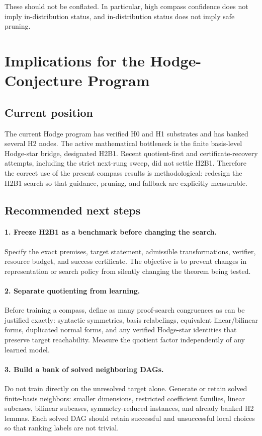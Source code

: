 \documentclass[11pt]{article}
\begin{document}
These should not be conflated. In particular, high compass confidence does not imply in-distribution status, and in-distribution status does not imply safe pruning.

\section{Implications for the Hodge-Conjecture Program}

\subsection{Current position}

The current Hodge program has verified H0 and H1 substrates and has banked several H2 nodes. The active mathematical bottleneck is the finite basis-level Hodge-star bridge, designated H2B1. Recent quotient-first and certificate-recovery attempts, including the strict next-rung sweep, did not settle H2B1. Therefore the correct use of the present compass results is methodological: redesign the H2B1 search so that guidance, pruning, and fallback are explicitly measurable.

\subsection{Recommended next steps}

\paragraph{1. Freeze H2B1 as a benchmark before changing the search.}
Specify the exact premises, target statement, admissible transformations, verifier, resource budget, and success certificate. The objective is to prevent changes in representation or search policy from silently changing the theorem being tested.

\paragraph{2. Separate quotienting from learning.}
Before training a compass, define as many proof-search congruences as can be justified exactly: syntactic symmetries, basis relabelings, equivalent linear/bilinear forms, duplicated normal forms, and any verified Hodge-star identities that preserve target reachability. Measure the quotient factor independently of any learned model.

\paragraph{3. Build a bank of solved neighboring DAGs.}
Do not train directly on the unresolved target alone. Generate or retain solved finite-basis neighbors: smaller dimensions, restricted coefficient families, linear subcases, bilinear subcases, symmetry-reduced instances, and already banked H2 lemmas. Each solved DAG should retain successful and unsuccessful local choices so that ranking labels are not trivial.
\end{document}
